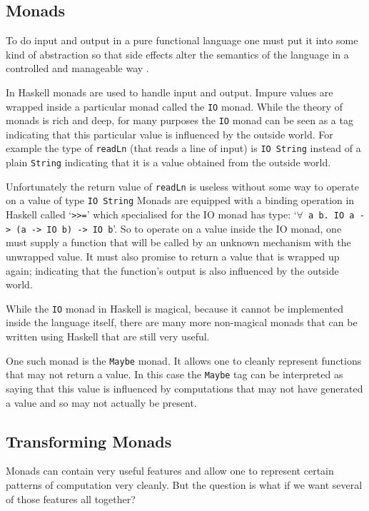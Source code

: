 \documentclass[]{article}
\newcommand{\function}[1]{\texttt{#1}}
\newcommand{\type}[1]{\texttt{#1}}
\begin{document}
\subsection{Monads}
To do input and output in a pure functional language one must put it into
some kind of abstraction so that side effects alter the semantics of the
language in a controlled and manageable way \cite{PeytonJones:2001}.

In Haskell monads are used to handle input and output. Impure values are
wrapped inside a particular monad called the \type{IO} monad. While the theory
of monads is rich and deep, for many purposes the \type{IO} monad can be seen
as a tag indicating that this particular value is influenced by the outside
world. For example the type of \function{readLn} (that reads a line of input)
is \type{IO String} instead of a plain \type{String} indicating that it is a
value obtained from the outside world.

Unfortunately the return value of \function{readLn} is useless without some
way to operate on a value of type \type{IO String} Monads are equipped with a
binding operation in Haskell called `\function{>>=}' which specialised for the
IO monad has type: `\type{$\forall$~a~b.~IO~a~->~(a~->~IO~b)~->~IO~b}'. So to
operate on a value inside the IO monad, one must supply a function that will
be called by an unknown mechanism with the unwrapped value. It must also
promise to return a value that is wrapped up again; indicating that the
function's output is also influenced by the outside world.

While the \type{IO} monad in Haskell is magical, because it cannot
be implemented inside the language itself, there are many
more non-magical monads that can be written using Haskell that are
still very useful.

One such monad is the \type{Maybe} monad. It allows one to cleanly represent
functions that may not return a value. In this case the \type{Maybe} tag can
be interpreted as saying that this value is influenced by computations that
may not have generated a value and so may not actually be present.

\subsection{Transforming Monads}
\label{discussion:monadtrans}

Monads can contain very useful features and allow one to represent
certain patterns of computation very cleanly. But the question is
what if we want several of those features all together?
\end{document}
